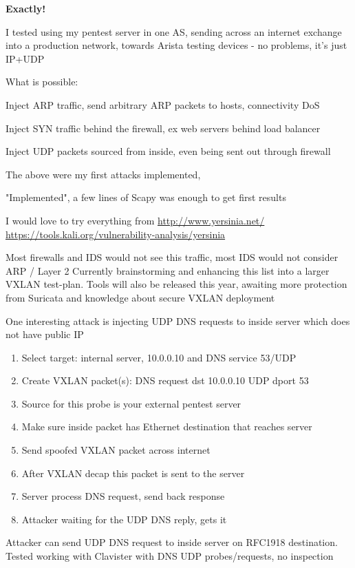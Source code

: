 \documentclass[16pt,landscape,a4paper,footrule]{foils}
\begin{document}
\vskip 1cm
{\bf\LARGE Exactly!}



I tested using my pentest server in one AS, sending across an internet exchange into a production network, towards Arista testing devices - no problems, it's just IP+UDP


What is possible:
\begin{list2}
\item Inject ARP traffic, send arbitrary ARP packets to hosts, connectivity DoS
\item Inject SYN traffic behind the firewall, ex web servers behind load balancer
\item Inject UDP packets sourced from inside, even being sent out through firewall
\item The above were my first attacks implemented,
\item "Implemented", a few lines of Scapy was enough to get first results \smiley
\item I would love to try everything from  \url{http://www.yersinia.net/}\\ \url{https://tools.kali.org/vulnerability-analysis/yersinia}
\end{list2}

Most firewalls and IDS would not see this traffic, most IDS would not consider ARP / Layer 2
\vskip 1cm
Currently brainstorming and enhancing this list into a larger VXLAN test-plan. Tools will also be released this year, awaiting more protection from Suricata and knowledge about secure VXLAN deployment




One interesting attack is injecting UDP DNS requests to inside server which does not have public IP

\begin{enumerate}
\item Select target: internal server, 10.0.0.10 and DNS service 53/UDP
\item Create VXLAN packet(s): DNS request dst 10.0.0.10 UDP dport 53
\item Source for this probe is your external pentest server
\item Make sure inside packet has Ethernet destination that reaches server
\item Send spoofed VXLAN packet across internet
\item After VXLAN decap this packet is sent to the server
\item Server process DNS request, send back response
\item Attacker waiting for the UDP DNS reply, gets it
\end{enumerate}
 Attacker can send UDP DNS request to inside server on RFC1918 destination.
 Tested working with Clavister with DNS UDP probes/requests, no inspection \smiley
\end{document}
